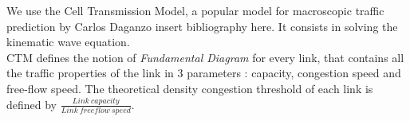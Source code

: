 We use the Cell Transmission Model, a popular model for macroscopic traffic prediction by Carlos Daganzo \color{blue}insert bibliography here\color{black}.
It consists in solving the kinematic wave equation.\\
CTM defines the notion of \emph{Fundamental Diagram} for every link, that contains all the traffic properties of the link in 3 parameters : capacity, congestion speed and free-flow speed.
The theoretical density congestion threshold of each link is defined by $\frac{Link\ capacity}{Link\ freeflow\ speed}$.